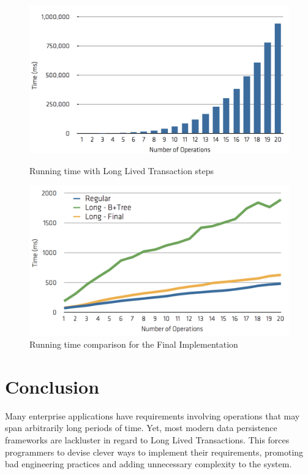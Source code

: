 \documentclass{llncs}
\begin{document}
\begin{figure}
\centering
\begin{minipage}{.5\textwidth}
  \centering
  \includegraphics[width=1\linewidth]{time-long-v1}
  \caption{Running time with Long Lived Transaction steps}
  \label{fig:longv1}
\end{minipage}%
\begin{minipage}{.5\textwidth}
  \centering
  \includegraphics[width=1\linewidth]{3-way-times}
  \caption{Running time comparison for the Final Implementation}
  \label{fig:comparisonFinal}
\end{minipage}
\end{figure}


\section{Conclusion}

Many enterprise applications have requirements involving operations
that may span arbitrarily long periods of time. Yet, most modern data
persistence frameworks are lackluster in regard to Long Lived
Transactions. This forces programmers to devise clever ways to
implement their requirements, promoting bad engineering practices and
adding unnecessary complexity to the system.
\end{document}
